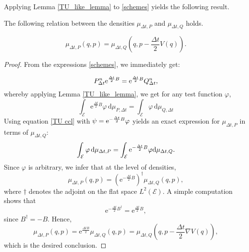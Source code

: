 Applying Lemma \ref{TU_like_lemma} to \eqref{schemes} yields the following result.
\begin{prop}\label{prop:mup_expression}
  The following relation between the densities $\mu_{\Delta t,P}$ and $\mu_{\Delta t,Q}$ holds.

  \begin{equation}
    \label{mu P expression}
    \mu_{\Delta t,P}(q,p) = \mu_{\Delta t,Q}\left(q,p-\frac{\Delta t}2V(q)\right).
  \end{equation}
\end{prop}
\begin{proof}
  From the expressions \eqref{schemes}, we immediately get:

\begin{equation}
  \label{TU relation}
  P_{\Delta t}^n\mathrm{e}^{\frac{\Delta t}2B}=\mathrm{e}^{\frac{\Delta t}2B}Q_{\Delta t}^n,
\end{equation}
whereby applying Lemma \ref{TU_like_lemma}, we get for any test function $\varphi$,
\begin{equation}
  \label{TU ccl}
  \int_{\mathcal E}\mathrm e^{\frac{\Delta t}2B}\varphi\, \mathrm{d}\mu_{P,\Delta t}=\int_{\mathcal E}\varphi\, \mathrm{d}\mu_{Q,\Delta t}
\end{equation}
Using equation \eqref{TU ccl} with $\psi=\mathrm{e}^{-\frac{\Delta t}2B}\varphi$ yields an exact expression for $\mu_{\Delta t,P}$ in terms of $\mu_{\Delta t,Q}$:
\begin{equation}
  \label{pi P expression}
  \int_{\mathcal E}\varphi\, \mathrm{d}\mu_{\Delta t,P} = \int_{\mathcal E}\mathrm{e}^{-\frac{\Delta t}2B}\varphi \mathrm{d}\mu_{\Delta t,Q}.
\end{equation}
Since $\varphi$ is arbitrary, we infer that at the level of densities,
\begin{equation}
  \mu_{\Delta t,P}(q,p)=\left(\mathrm{e}^{-\frac{\Delta t}2B}\right)^\dagger\mu_{\Delta t,Q}(q,p),
\end{equation}
where $\dagger$ denotes the adjoint on the flat space $L^2(\mathcal E)$. A simple computation shows that 
$$\mathrm e^{-\frac{\Delta t}2 B^\dagger}=\mathrm{e}^{\frac{\Delta t}2B},$$
since $B^\dagger=-B$.
Hence,
\begin{equation}\label{prop1 ccl}
  \mu_{\Delta t,P}(q,p) = \mathrm{e}^{\frac{\Delta t B}2}\mu_{\Delta t,Q}(q,p)=\mu_{\Delta t,Q}\left(q,p-\frac{\Delta t}2\nabla V(q)\right),
\end{equation}
which is the desired conclusion.
\end{proof}

